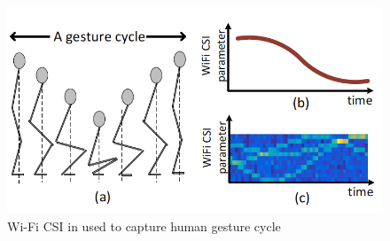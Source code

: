 \documentclass[conference]{IEEEtran}
\begin{document}
 \begin{figure}[h!]
    \includegraphics[scale=0.35]{fig6.png}
    \caption{Wi-Fi CSI in used to capture human gesture cycle}
    \label{fig:me}
\end{figure}
\end{document}
